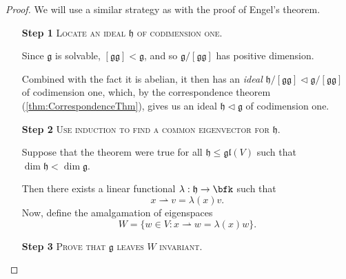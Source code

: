 \documentclass{article}
\newcommand*\tle{\ensuremath{\mathrel{\lhd}}}
\newcommand{\lb}[1]{\ensuremath{\left[{#1}\right]}}
\newcommand*\frkg{{\ensuremath{\mathfrak{g}}}}
\newcommand*\frkh{{\ensuremath{\mathfrak{h}}}}
\newcommand*\glalg{\ensuremath{\mathfrak{gl}}}
\newcommand*\acts{\ensuremath{\rightharpoonup}}
\begin{document}
\begin{proof} 
    We will use a similar strategy as with the proof of Engel's theorem.
    \begin{itemize}
        \item[\textbf{Step 1}] 
            \textsc{\color{Crimson} Locate an ideal $\frkh$ of codimension one.}

            Since $\frkg$ is solvable, $\lb{\frkg\frkg} < \frkg$, and so $\frkg/\lb{\frkg\frkg}$ has positive dimension.

            Combined with the fact it is abelian, it then has an \textit{ideal} $\frkh/\lb{\frkg\frkg} \tle \frkg/\lb{\frkg\frkg}$ of codimension one, which, by the correspondence theorem (\ref{thm:CorrespondenceThm}), gives us an ideal $\frkh \tle \frkg$ of codimension one.
        \item[\textbf{Step 2}]
            \textsc{\color{Crimson} Use induction to find a common eigenvector for $\frkh$.}

            Suppose that the theorem were true for all $\frkh \leq \glalg(V)$ such that $\dim \frkh < \dim \frkg$.

            Then there exists a linear functional $\lambda: \frkh \to \bfk$ such that
            \[
                x \acts v 
                =
                \lambda(x)v.
            \]
            Now, define the amalgamation of eigenspaces 
            \[
                W
                =
                \Big\{
                    w \in V:
                    x \acts w
                    =
                    \lambda(x)w
                \Big\}.
            \]
        \item[\textbf{Step 3}]
            \textsc{\color{Crimson} Prove that $\frkg$ leaves $W$ invariant.}


\end{itemize}
\end{proof}
\end{document}
